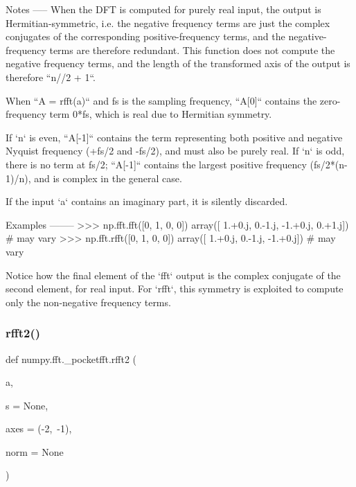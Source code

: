 \begin{DoxyVerb}
Notes
-----
When the DFT is computed for purely real input, the output is
Hermitian-symmetric, i.e. the negative frequency terms are just the complex
conjugates of the corresponding positive-frequency terms, and the
negative-frequency terms are therefore redundant.  This function does not
compute the negative frequency terms, and the length of the transformed
axis of the output is therefore ``n//2 + 1``.

When ``A = rfft(a)`` and fs is the sampling frequency, ``A[0]`` contains
the zero-frequency term 0*fs, which is real due to Hermitian symmetry.

If `n` is even, ``A[-1]`` contains the term representing both positive
and negative Nyquist frequency (+fs/2 and -fs/2), and must also be purely
real. If `n` is odd, there is no term at fs/2; ``A[-1]`` contains
the largest positive frequency (fs/2*(n-1)/n), and is complex in the
general case.

If the input `a` contains an imaginary part, it is silently discarded.

Examples
--------
>>> np.fft.fft([0, 1, 0, 0])
array([ 1.+0.j,  0.-1.j, -1.+0.j,  0.+1.j]) # may vary
>>> np.fft.rfft([0, 1, 0, 0])
array([ 1.+0.j,  0.-1.j, -1.+0.j]) # may vary

Notice how the final element of the `fft` output is the complex conjugate
of the second element, for real input. For `rfft`, this symmetry is
exploited to compute only the non-negative frequency terms.\end{DoxyVerb}
 \mbox{\label{namespacenumpy_1_1fft_1_1__pocketfft_a30c7c6357776ec008e22aee5f2996d1c}} 
\subsubsection{\texorpdfstring{rfft2()}{rfft2()}}
{\footnotesize\ttfamily def numpy.\+fft.\+\_\+pocketfft.\+rfft2 (\begin{DoxyParamCaption}\item[{}]{a,  }\item[{}]{s = {\ttfamily None},  }\item[{}]{axes = {\ttfamily (-\/2,~-\/1)},  }\item[{}]{norm = {\ttfamily None} }\end{DoxyParamCaption})}

